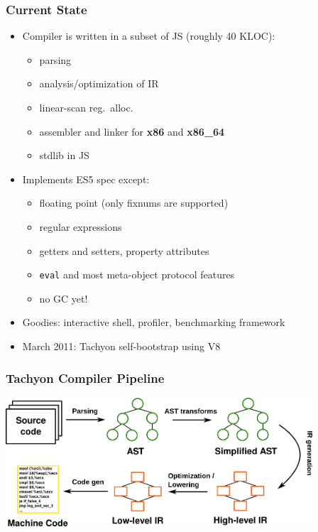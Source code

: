\begin{frame}
\frametitle{\bf Current State}

  \begin{itemize}

  \item Compiler is written in a subset of JS (roughly 40 KLOC):
    \begin{itemize}
    \item parsing
    \item analysis/optimization of IR
    \item linear-scan reg.~alloc.
    \item assembler and linker for {\bf x86} and {\bf x86\_64}
    \item stdlib in JS
    \end{itemize}
    \smallskip

  \item Implements ES5 spec except:
    \begin{itemize}
    \item floating point (only fixnums are supported)
    \item regular expressions
    \item getters and setters, property attributes
    \item {\tt eval} and most meta-object protocol features
    \item no GC yet!
    \end{itemize}
    \smallskip

  \item Goodies: interactive shell, profiler, benchmarking framework
    \smallskip

  \item March 2011: Tachyon self-bootstrap using V8
    \smallskip

  \end{itemize}
\end{frame}

%
%
\begin{frame}
\frametitle{\bf Tachyon Compiler Pipeline}
\begin{center}
\includegraphics[width=4.5in]{images/phases}
\end{center}
\end{frame}


